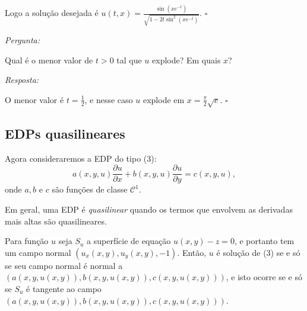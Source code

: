 \documentclass[11pt,twoside,a4paper]{book}
\begin{document}
\medskip
\noindent
Logo a solução desejada é $u(t,x)=\frac{\sin(xe^{-t})}{\sqrt{1-2t\sin^2(xe^{-t})}}$. $\square$

\medskip
\noindent
\textit{Pergunta:}

\smallskip
\noindent
Qual é o menor valor de $t>0$ tal que $u$ explode? Em quais $x$?

\smallskip
\noindent
\textit{Resposta:}

\smallskip
\noindent
O menor valor é $t=\frac{1}{2}$, e nesse caso $u$ explode em $x=\frac{\pi}{2}\sqrt{e}$. $\square$


\subsection{EDPs quasilineares}

Agora consideraremos a EDP do tipo (3):
\begin{equation*}
    a(x,y,u)\frac{\partial u}{\partial x}+b(x,y,u)\frac{\partial u}{\partial y}=c(x,y,u),
\end{equation*}
onde $a,b$ e $c$ são funções de classe $\mathcal{C}^1.$ 

\bigskip
\noindent
Em geral, uma EDP é \emph{quasilinear} quando os termos que envolvem as derivadas mais altas são quasilineares.

\bigskip
\noindent
Para função $u$ seja $S_u$ a superfície de equação $u(x,y)-z=0$, e portanto tem um campo normal $(u_x(x,y),u_y(x,y),-1)$. Então, $u$ é solução de (3) se e só se seu campo normal é normal a $(a(x,y,u(x,y)),b(x,y,u(x,y)),c(x,y,u(x,y)))$, e isto ocorre se e só se $S_u$ é tangente ao campo $(a(x,y,u(x,y)),b(x,y,u(x,y)),c(x,y,u(x,y)))$.
\end{document}
